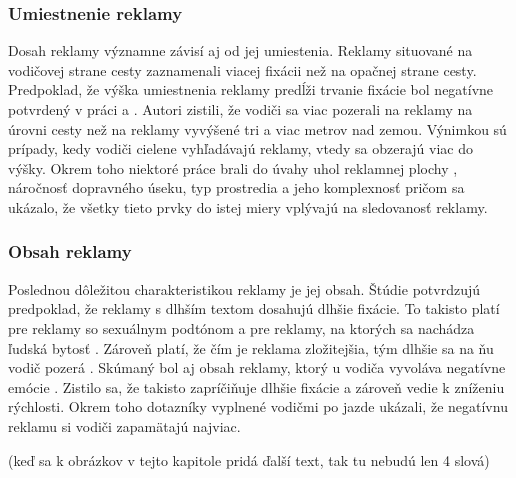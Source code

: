 \subsubsection{Umiestnenie reklamy}
Dosah reklamy významne závisí aj od jej umiestenia. Reklamy situované na vodičovej strane cesty zaznamenali viacej fixácii než na opačnej strane cesty. Predpoklad, že výška umiestnenia reklamy predĺži trvanie fixácie bol negatívne potvrdený v práci \cite{costa} a \cite{crundall}. Autori zistili, že vodiči sa viac pozerali na reklamy na úrovni cesty než na reklamy vyvýšené tri a viac metrov nad zemou. Výnimkou sú prípady, kedy vodiči cielene vyhľadávajú reklamy, vtedy sa obzerajú viac do výšky. Okrem toho niektoré práce brali do úvahy uhol reklamnej plochy \cite{zalesinska2018impact}, náročnosť dopravného úseku, typ prostredia a jeho komplexnosť \cite{costa, mollu2018driving} pričom sa ukázalo, že všetky tieto prvky do istej miery vplývajú na sledovanosť reklamy.

\subsubsection{Obsah reklamy}

Poslednou dôležitou charakteristikou reklamy je jej obsah. Štúdie \cite{harasimczuk2021longer, meuleners2020identifying} potvrdzujú predpoklad, že reklamy s dlhším textom dosahujú dlhšie fixácie. To takisto platí pre reklamy so sexuálnym podtónom \cite{MaliszewskiNorbert2019Iosa} a pre reklamy, na ktorých sa nachádza ľudská bytosť \cite{tarnowski2017roadside}. Zároveň platí, že čím je reklama zložitejšia, tým dlhšie sa na ňu vodič pozerá \cite{marciano2017effect}. Skúmaný bol aj obsah reklamy, ktorý u vodiča vyvoláva negatívne emócie \cite{chan2013emotional}. Zistilo sa, že takisto zapríčiňuje dlhšie fixácie a zároveň vedie k zníženiu rýchlosti. Okrem toho dotazníky vyplnené vodičmi po jazde ukázali, že negatívnu reklamu si vodiči zapamätajú najviac.

(keď sa k obrázkov v tejto kapitole pridá ďalší text, tak tu nebudú len 4 slová)




